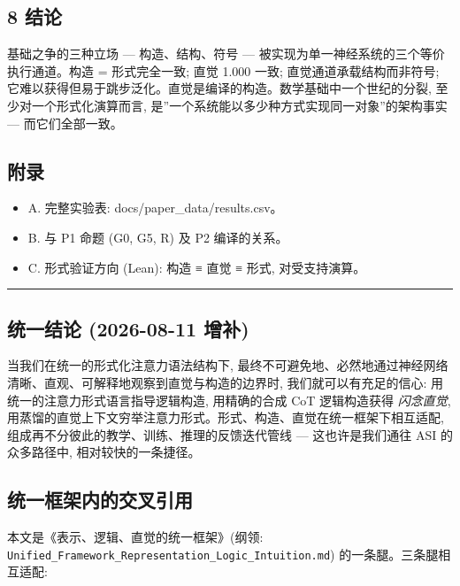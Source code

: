 \documentclass[
]{article}
\providecommand{\tightlist}{%
  \setlength{\itemsep}{0pt}\setlength{\parskip}{0pt}}
\begin{document}
\subsection{8 结论}\label{ux7ed3ux8bba}

基础之争的三种立场 --- 构造、结构、符号 ---
被实现为单一神经系统的三个等价执行通道。构造 = 形式完全一致; 直觉 1.000
一致; 直觉通道承载结构而非符号;
它难以获得但易于跳步泛化。直觉是编译的构造。数学基础中一个世纪的分裂,
至少对一个形式化演算而言,
是''一个系统能以多少种方式实现同一对象''的架构事实 --- 而它们全部一致。

\subsection{附录}\label{ux9644ux5f55}

\begin{itemize}
\tightlist
\item
  A. 完整实验表: docs/paper\_data/results.csv。
\item
  B. 与 P1 命题 (G0, G5, R) 及 P2 编译的关系。
\item
  C. 形式验证方向 (Lean): 构造 ≡ 直觉 ≡ 形式, 对受支持演算。
\end{itemize}

\begin{center}\rule{0.5\linewidth}{0.5pt}\end{center}

\subsection{统一结论 (2026-08-11
增补)}\label{ux7edfux4e00ux7ed3ux8bba-2026-08-11-ux589eux8865}

当我们在统一的形式化注意力语法结构下,
最终不可避免地、必然地通过神经网络清晰、直观、可解释地观察到直觉与构造的边界时,
我们就可以有充足的信心: 用统一的注意力形式语言指导逻辑构造, 用精确的合成
CoT 逻辑构造获得 \emph{闪念直觉},
用蒸馏的直觉上下文穷举注意力形式。形式、构造、直觉在统一框架下相互适配,
组成再不分彼此的教学、训练、推理的反馈迭代管线 --- 这也许是我们通往 ASI
的众多路径中, 相对较快的一条捷径。

\subsection{统一框架内的交叉引用}\label{ux7edfux4e00ux6846ux67b6ux5185ux7684ux4ea4ux53c9ux5f15ux7528}

本文是《表示、逻辑、直觉的统一框架》(纲领:
\texttt{Unified\_Framework\_Representation\_Logic\_Intuition.md})
的一条腿。三条腿相互适配:
\end{document}
